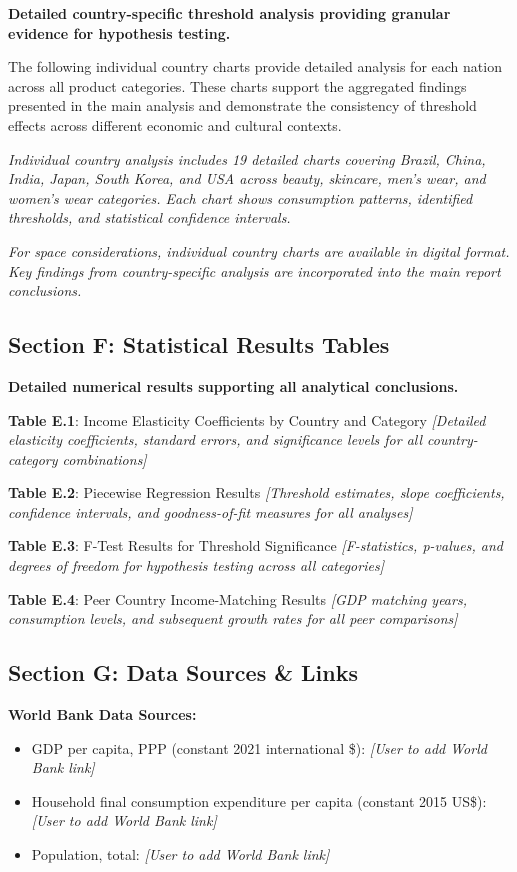 \documentclass[11pt]{article}
\begin{document}
\textbf{Detailed country-specific threshold analysis providing granular evidence for hypothesis testing.}

The following individual country charts provide detailed analysis for each nation across all product categories. These charts support the aggregated findings presented in the main analysis and demonstrate the consistency of threshold effects across different economic and cultural contexts.

\textit{Individual country analysis includes 19 detailed charts covering Brazil, China, India, Japan, South Korea, and USA across beauty, skincare, men's wear, and women's wear categories. Each chart shows consumption patterns, identified thresholds, and statistical confidence intervals.}

\textit{For space considerations, individual country charts are available in digital format. Key findings from country-specific analysis are incorporated into the main report conclusions.}

\subsection*{Section F: Statistical Results Tables}

\textbf{Detailed numerical results supporting all analytical conclusions.}

\textbf{Table E.1}: Income Elasticity Coefficients by Country and Category
\textit{[Detailed elasticity coefficients, standard errors, and significance levels for all country-category combinations]}

\textbf{Table E.2}: Piecewise Regression Results  
\textit{[Threshold estimates, slope coefficients, confidence intervals, and goodness-of-fit measures for all analyses]}

\textbf{Table E.3}: F-Test Results for Threshold Significance
\textit{[F-statistics, p-values, and degrees of freedom for hypothesis testing across all categories]}

\textbf{Table E.4}: Peer Country Income-Matching Results
\textit{[GDP matching years, consumption levels, and subsequent growth rates for all peer comparisons]}

\subsection*{Section G: Data Sources \& Links}

\textbf{World Bank Data Sources:}
\begin{itemize}
    \item GDP per capita, PPP (constant 2021 international \$): \textit{[User to add World Bank link]}
    \item Household final consumption expenditure per capita (constant 2015 US\$): \textit{[User to add World Bank link]}
    \item Population, total: \textit{[User to add World Bank link]}
\end{itemize}
\end{document}
